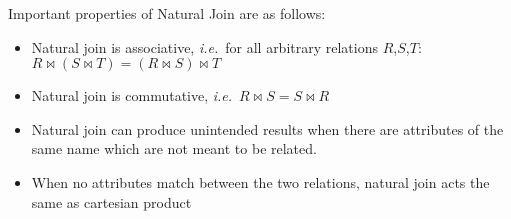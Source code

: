 \documentclass{report}
\begin{document}
         \vspace{.5cm}
         

        
        \par Important properties of Natural Join are as follows:
        \begin{itemize}
            \item Natural join is associative, \textit{i.e.}\  for all arbitrary relations $R$,$S$,$T$: $R\bowtie (S \bowtie T) = (R\bowtie S) \bowtie T$
            \item Natural join is commutative, \textit{i.e.}\ $R\bowtie S = S \bowtie R$
            \item Natural join can produce unintended results when there are attributes of the same name which are not meant to be related.
            \item When no attributes match between the two relations, natural join acts the same as cartesian product
        \end{itemize}


        \subsubsection{}
\end{document}
